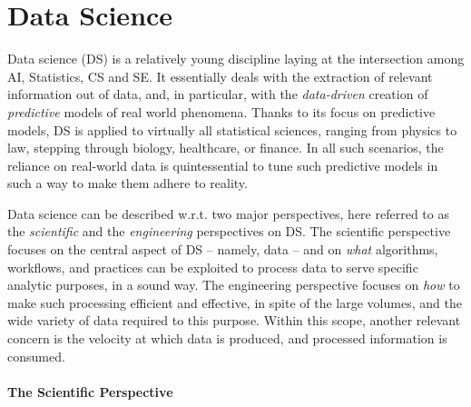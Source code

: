 \documentclass[12pt,a4paper,openright,twoside]{book}
\begin{document}
\section{Data Science}
%

Data science (DS) is a relatively young discipline laying at the intersection among AI, Statistics, CS and SE.
%
It essentially deals with the extraction of relevant information out of data, and, in particular, with the \emph{data-driven} creation of \emph{predictive} models of real world phenomena.
%
Thanks to its focus on predictive models, DS is applied to virtually all statistical sciences, ranging from physics to law, stepping through biology, healthcare, or finance.
%
In all such scenarios, the reliance on real-world data is quintessential to tune such predictive models in such a way to make them adhere to reality.

Data science can be described w.r.t. two major perspectives, here referred to as the \emph{scientific} and the \emph{engineering} perspectives on DS.
%
The scientific perspective focuses on the central aspect of DS -- namely, data -- and on \emph{what} algorithms, workflows, and practices can be exploited to process data to serve specific analytic purposes, in a sound way.
%
The engineering perspective focuses on \emph{how} to make such processing efficient and effective, in spite of the large volumes, and the wide variety of data required to this purpose.
%
Within this scope, another relevant concern is the velocity at which data is produced, and processed information is consumed.

\paragraph{The Scientific Perspective}
\end{document}
